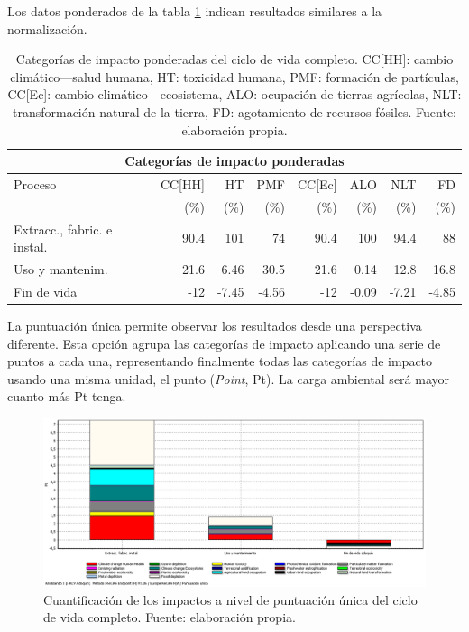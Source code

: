 Los datos ponderados de la tabla \ref{categoriasimpactocompletoponderados} indican resultados similares a la normalización.

\begin{table}[!htb]
\centering
\begin{tabular}{p{4cm}rrrrrrr}
\toprule
\multicolumn{8}{c}{Categorías de impacto ponderadas}\\
\midrule
Proceso & CC[HH] & HT & PMF & CC[Ec] & ALO & NLT & FD\\
 &  (\%) & (\%) & (\%) & (\%) & (\%) & (\%) & (\%)\\
\midrule
Extracc., fabric. e instal. & 90.4 & 101 & 74 & 90.4 & 100 & 94.4 & 88\\
Uso y mantenim. & 21.6 & 6.46 & 30.5 & 21.6 & 0.14 & 12.8 & 16.8\\
Fin de vida & -12 & -7.45 & -4.56 & -12 & -0.09 & -7.21 & -4.85\\
\bottomrule
\end{tabular}
\caption[Categorías de impacto ponderadas del ciclo de vida completo.]{Categorías de impacto ponderadas del ciclo de vida completo. CC[HH]: cambio climático—salud humana, HT: toxicidad humana, PMF: formación de partículas, CC[Ec]: cambio climático—ecosistema, ALO: ocupación de tierras agrícolas, NLT: transformación natural de la tierra, FD: agotamiento de recursos fósiles. Fuente: elaboración propia.}
\label{categoriasimpactocompletoponderados}
\end{table}

La puntuación única permite observar los resultados desde una perspectiva diferente. Esta opción agrupa las categorías de impacto aplicando una serie de puntos a cada una, representando finalmente todas las categorías de impacto usando una misma unidad, el punto (\textit{Point}, Pt). La carga ambiental será mayor cuanto más Pt tenga.

\begin{figure}[!htb]
\centering
\includegraphics[width=15cm]{img/completo_puntuacionunica.png}
\caption[Cuantificación de los impactos a nivel de puntuación única del ciclo de vida completo.]{Cuantificación de los impactos a nivel de puntuación única del ciclo de vida completo. Fuente: elaboración propia.}
\label{fig:completo_puntuacionunica}
\end{figure}

